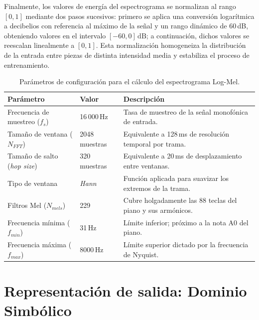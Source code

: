 Finalmente, los valores de energía del espectrograma se normalizan al
rango $[0, 1]$ mediante dos pasos sucesivos: primero se aplica una
conversión logarítmica a decibelios con referencia al máximo de la señal
y un rango dinámico de 60\,dB, obteniendo valores en el intervalo
$[-60, 0]\,\mathrm{dB}$; a continuación, dichos valores se reescalan
linealmente a $[0, 1]$. Esta normalización homogeneiza la distribución
de la entrada entre piezas de distinta intensidad media y estabiliza el
proceso de entrenamiento.

\begin{table}[htbp]
    \centering
    \renewcommand{\arraystretch}{1.3}
    \begin{tabular}{l l p{7.5cm}}
        \hline
        \textbf{Parámetro} & \textbf{Valor} & \textbf{Descripción} \\
        \hline
        Frecuencia de muestreo ($f_s$)      & 16\,000\,Hz   &
            Tasa de muestreo de la señal monofónica de entrada. \\
        Tamaño de ventana ($N_{FFT}$)        & 2048 muestras &
            Equivalente a 128\,ms de resolución temporal por trama. \\
        Tamaño de salto (\textit{hop size})  & 320 muestras  &
            Equivalente a 20\,ms de desplazamiento entre ventanas. \\
        Tipo de ventana                      & \textit{Hann} &
            Función aplicada para suavizar los extremos de la trama. \\
        Filtros Mel ($N_{mels}$)             & 229           &
            Cubre holgadamente las 88 teclas del piano y sus armónicos. \\
        Frecuencia mínima ($f_{min}$)        & 31\,Hz        &
            Límite inferior; próximo a la nota A0 del piano. \\
        Frecuencia máxima ($f_{max}$)        & 8000\,Hz      &
            Límite superior dictado por la frecuencia de Nyquist. \\
        \hline
    \end{tabular}
    \caption{Parámetros de configuración para el cálculo del espectrograma
    Log-Mel.}
    \label{tab:parametros_espectrograma}
\end{table}

\section{Representación de salida: Dominio Simbólico}
\label{sec:dominio_simbolico}

